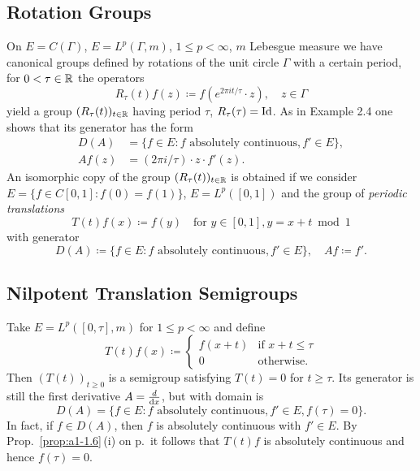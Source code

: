 \subsection{Rotation Groups}\label{subsec:a1-2.5}
On $E = C(\Gamma)$, \resp $E = L^{p}(\Gamma,m)$, $1 \leq p < \infty$, $m$ Lebesgue measure we have canonical groups defined by rotations of the unit circle $\Gamma$ with a certain period, \ie for $0 < \tau \in \mathbb{R}$ the operators
\[
    R_{\tau}(t)f(z) \coloneqq f(e^{2\pi it/\tau}\cdot z), \quad z \in \Gamma
\]
yield a group $(R_{\tau}(t))_{t \in \mathbb{R}}$ having period $\tau$, \ie $R_{\tau}(\tau) = \operatorname{Id}$.
As in Example 2.4 one shows that its generator has the form
\begin{align*}
    D(A) &= \{f \in E \colon f \text{ absolutely continuous}, f' \in E\}, \\
    Af(z)&= (2\pi i/\tau) \cdot z \cdot f'(z).
\end{align*}
An isomorphic copy of the group $(R_{\tau}(t))_{t \in \mathbb{R}}$ is obtained if we consider $E = \{f \in C\left[ 0,1 \right] \colon f(0) = f(1)\}$, \resp $E = L^{p}(\left[ 0,1 \right])$ and the group of \emph{periodic translations}
\[
    T(t)f(x) \coloneqq f(y) \quad \text{for $y \in \left[ 0,1 \right], y = x+t \bmod 1$} 
\]
with generator
\[
    D(A) \coloneqq \{f \in E \colon f \text{ absolutely continuous}, f' \in E\},
    \quad Af \coloneqq f'.
\]
\subsection{Nilpotent Translation Semigroups}\label{subsec:a1-2.6}
Take $E = L^{p}([0,\tau],m)$ for $1 \leq p < \infty$ and define
\[
    T(t)f(x) \coloneqq \begin{cases}
        f(x+t) & \text{if } x+t \leq \tau \\
        0 & \text{otherwise.}
    \end{cases}
\]
Then $(T(t))_{t\geq 0}$ is a semigroup satisfying $T(t) = 0$ for $t \geq \tau$.
Its generator is still the first derivative $A = \frac{d}{\mathop{}\!\mathrm{d}{x}}$, but with domain is 
\[
D(A) = \{f \in E \colon f \text{ absolutely continuous}, f' \in E, f(\tau) = 0\}.
\]
In fact, if $f \in D(A)$, then $f$ is absolutely continuous with $f' \in E$.
By Prop.~\ref{prop:a1-1.6}\,(i) on p.\,\pageref{prop:a1-1.6} it follows that $T(t)f$ is absolutely continuous and hence $f(\tau) = 0$.
